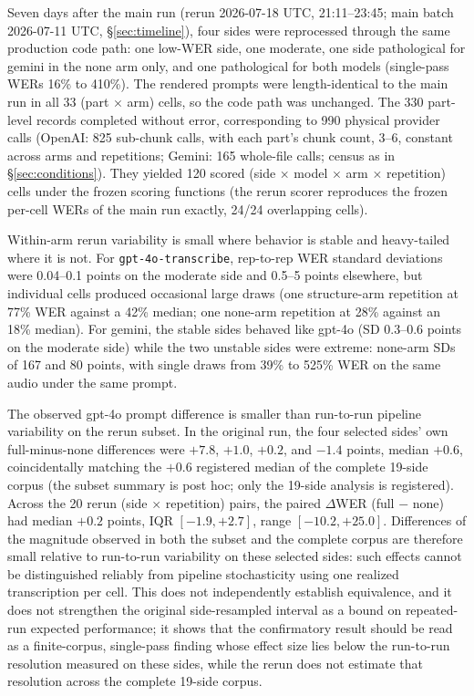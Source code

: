 \documentclass[11pt]{article}
\begin{document}
Seven days after the main run (rerun 2026-07-18 UTC, 21:11--23:45; main batch 2026-07-11 UTC, \S\ref{sec:timeline}), four sides were reprocessed through the same production code path: one low-WER side, one moderate, one side pathological for gemini in the none arm only, and one pathological for both models (single-pass WERs 16\% to 410\%). The rendered prompts were length-identical to the main run in all 33 (part $\times$ arm) cells, so the code path was unchanged. The 330 part-level records completed without error, corresponding to 990 physical provider calls (OpenAI: 825 sub-chunk calls, with each part's chunk count, 3--6, constant across arms and repetitions; Gemini: 165 whole-file calls; census as in \S\ref{sec:conditions}). They yielded 120 scored (side $\times$ model $\times$ arm $\times$ repetition) cells under the frozen scoring functions (the rerun scorer reproduces the frozen per-cell WERs of the main run exactly, 24/24 overlapping cells).

Within-arm rerun variability is small where behavior is stable and heavy-tailed where it is not. For \texttt{gpt-4o-transcribe}, rep-to-rep WER standard deviations were 0.04--0.1 points on the moderate side and 0.5--5 points elsewhere, but individual cells produced occasional large draws (one structure-arm repetition at 77\% WER against a 42\% median; one none-arm repetition at 28\% against an 18\% median). For gemini, the stable sides behaved like gpt-4o (SD 0.3--0.6 points on the moderate side) while the two unstable sides were extreme: none-arm SDs of 167 and 80 points, with single draws from 39\% to 525\% WER on the same audio under the same prompt.

The observed gpt-4o prompt difference is smaller than run-to-run pipeline variability on the rerun subset. In the original run, the four selected sides' own full-minus-none differences were $+7.8$, $+1.0$, $+0.2$, and $-1.4$ points, median $+0.6$, coincidentally matching the $+0.6$ registered median of the complete 19-side corpus (the subset summary is post hoc; only the 19-side analysis is registered). Across the 20 rerun (side $\times$ repetition) pairs, the paired $\Delta$WER (full $-$ none) had median $+0.2$ points, IQR $[-1.9, +2.7]$, range $[-10.2, +25.0]$. Differences of the magnitude observed in both the subset and the complete corpus are therefore small relative to run-to-run variability on these selected sides: such effects cannot be distinguished reliably from pipeline stochasticity using one realized transcription per cell. This does not independently establish equivalence, and it does not strengthen the original side-resampled interval as a bound on repeated-run expected performance; it shows that the confirmatory result should be read as a finite-corpus, single-pass finding whose effect size lies below the run-to-run resolution measured on these sides, while the rerun does not estimate that resolution across the complete 19-side corpus.
\end{document}

